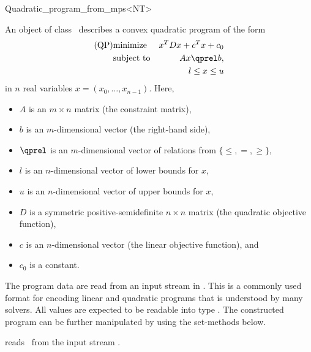 \begin{ccRefClass}{Quadratic_program_from_mps<NT>}


\ccDefinition
An object of class \ccRefName\ describes a convex quadratic program of the form
\begin{eqnarray*}
\mbox{(QP)}& \mbox{minimize} & x^{T}Dx+c^{T}x+c_0 \\
&\mbox{subject to}   & Ax\qprel b, \\
&                    & l \leq x \leq u
\end{eqnarray*}
in $n$ real variables $x=(x_0,\ldots,x_{n-1})$.
Here, 
\begin{itemize}
\item $A$ is an $m\times n$ matrix (the constraint matrix), 
\item $b$ is an $m$-dimensional vector (the right-hand side),
\item $\qprel$ is an $m$-dimensional vector of relations 
from $\{\leq, =, \geq\}$, 
\item $l$ is an $n$-dimensional vector of lower
bounds for $x$,
\item $u$ is an $n$-dimensional vector of upper bounds for
$x$, 
\item $D$ is a symmetric positive-semidefinite $n\times n$ matrix (the
  quadratic objective function),
\item $c$ is an $n$-dimensional vector (the linear objective
  function), and 
\item $c_0$ is a constant.
\end{itemize}

The program data are read from an input stream in . This is
a commonly used format for encoding linear and quadratic programs that
is understood by many solvers. All values are expected to be readable
into type . The constructed program can be further manipulated 
by using the set-methods below.

\ccIsModel
{}

\ccTypes
{}

\ccCreation
\ccIndexClassCreation
{}

{reads \ccVar\ from the input stream .}

\ccOperations



\end{ccRefClass}
